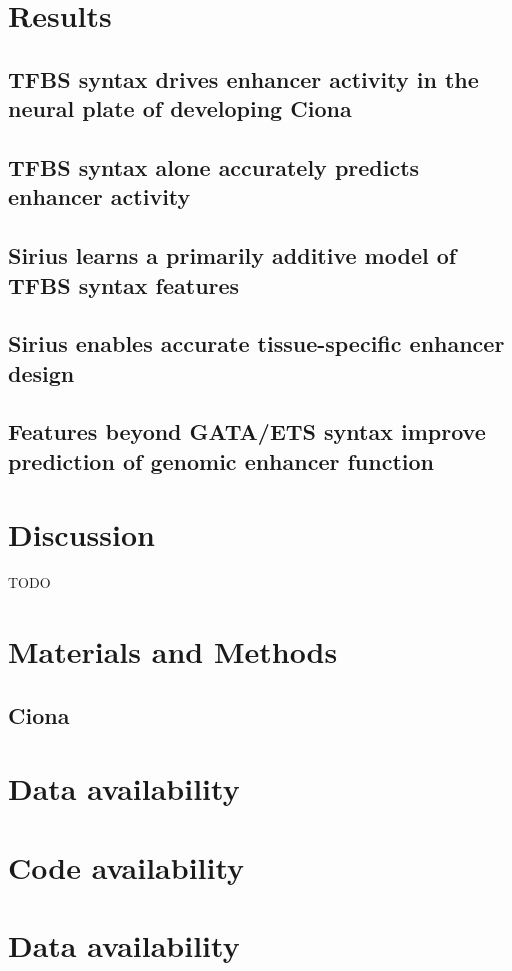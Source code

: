 \section{Results}

\subsection{TFBS syntax drives enhancer activity in the neural plate of developing Ciona}

\subsection{TFBS syntax alone accurately predicts enhancer activity}

\subsection{Sirius learns a primarily additive model of TFBS syntax features}

\subsection{Sirius enables accurate tissue-specific enhancer design}

\subsection{Features beyond GATA/ETS syntax improve prediction of genomic enhancer function}

\section{Discussion}

TODO

\section{Materials and Methods}

\subsection{Ciona}


\section{Data availability}

\section{Code availability}

\section{Data availability}

